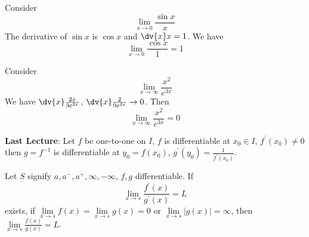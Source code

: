 \documentclass{report}
\begin{document}
\begin{examples}
    \begin{example}
        Consider
            \begin{equation*}
                \lim\limits_{x \to 0}\dfrac{\sin{x}}{x}
            \end{equation*}
        The derivative of $\sin{x}$ is $\cos{x}$ and $\dv{x}x = 1$. We have
            \begin{equation*}
                \lim\limits_{x \to 0}\dfrac{\cos{x}}{1} = 1
            \end{equation*}
    \end{example}
    \begin{example}
        Consider
            \begin{equation*}
                \lim\limits_{x \to \infty}\dfrac{x^{2}}{e^{3x}}
            \end{equation*}
        We have $\dv{x}\frac{2x}{3e^{3x}}$, $\dv{x}\frac{2}{9e^{3x}} \rightarrow 0$. Then 
            \begin{equation*}
                \lim\limits_{x \to \infty}\dfrac{x^{2}}{e^{3x}} = 0
            \end{equation*}
    \end{example}
\end{examples}

\textbf{Last Lecture}: Let $f$ be one-to-one on $I$, $f$ is differentiable at $x_{0} \in I$, $f^{\prime}(x_{0}) \neq 0$ then $g = f^{-1}$ is differentiable at $y_{0} = f(x_{0})$, $g^{\prime}(y_{0}) = \frac{1}{f^{\prime}(x_{0})}$.

Let $S$ signify $a, a^{-}, a^{+}, \infty, -\infty$, $f, g$ differentiable. If 
    \begin{equation*}
        \lim\limits_{x \to s}\dfrac{f^{\prime}(x)}{g^{\prime}(x)} = L
    \end{equation*}
exists, if $\lim\limits_{x \to s}f(x) = \lim\limits_{x \to s}g(x) = 0$ or $\lim\limits_{x \to s} \lvert g(x) \rvert = \infty$, then $\lim\limits_{x \to s}\frac{f(x)}{g(x)} = L$.
\end{document}
